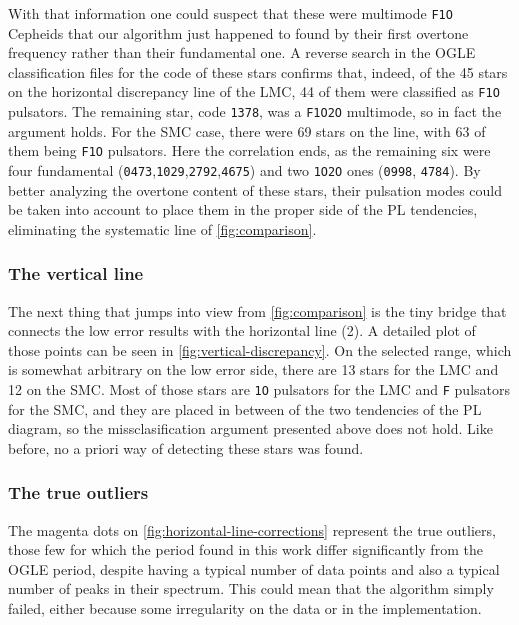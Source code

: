 With that information one could suspect that these were multimode \texttt{F1O} Cepheids 
that our algorithm just happened to found by their first overtone frequency rather than their fundamental one.
A reverse search in the OGLE classification files for the code of these stars confirms that, indeed, 
of the 45 stars on the horizontal discrepancy line of the LMC, 44 of them were classified as \texttt{F1O} pulsators.
The remaining star, code \texttt{1378}, was a \texttt{F1O2O} multimode, so in fact the argument holds.
For the SMC case, there were 69 stars on the line, with 63 of them being \texttt{F1O} pulsators.
Here the correlation ends, as the remaining six were four fundamental (\texttt{0473},\texttt{1029},\texttt{2792},\texttt{4675}) 
and two \texttt{1O2O} ones (\texttt{0998}, \texttt{4784}).
By better analyzing the overtone content of these stars, 
their pulsation modes could be taken into account to place them in the proper side of the PL tendencies,
eliminating the systematic line of \autoref{fig:comparison}.

\subsubsection{The vertical line}

The next thing that jumps into view from \autoref{fig:comparison} is the tiny bridge 
that connects the low error results with the horizontal line (2).
A detailed plot of those points can be seen in \autoref{fig:vertical-discrepancy}. 
On the selected range, which is somewhat arbitrary on the low error side, there are 13 stars for the LMC and 12 on the SMC.
Most of those stars are \texttt{1O} pulsators for the LMC and \texttt{F} pulsators for the SMC, 
and they are placed in between of the two tendencies of the PL diagram, so the missclasification argument presented above does not hold.
Like before, no a priori way of detecting these stars was found.

\subsubsection{The true outliers}

The magenta dots on \autoref{fig:horizontal-line-corrections} represent the true outliers, 
those few for which the period found in this work differ significantly from the OGLE period,
despite having a typical number of data points and also a typical number of peaks in their spectrum.
This could mean that the algorithm simply failed, either because some irregularity on the data or in the implementation. 


